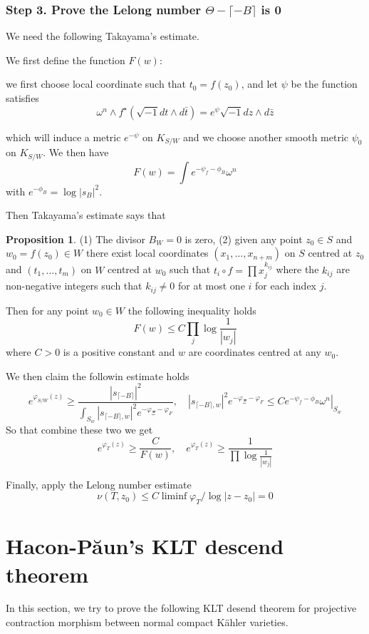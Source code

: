 \documentclass[11pt]{article}
\theoremstyle{definition}
\newtheorem{proposition}[theorem]{Proposition}
\begin{document}
	\subsubsection{Step 3. Prove the Lelong number $\Theta - \lceil -B \rceil $ is 0}
	
	We need the following Takayama's estimate.
	
	
	We first define the function $F(w)$: 
	
	we first choose local coordinate such that $t_0  =f (z_0)$, and let $\psi$ be the function satisfies $$\omega^n \wedge f^{\star}(\sqrt{-1} d t \wedge d \bar{t})=e^\psi \sqrt{-1} d z \wedge d \bar{z}$$
	
	which will induce a metric $e^{-\psi}$ on $K_{S/W}$ and we choose another smooth metric $\psi_0$ on $K_{S/W}$. We then have $$F(w) =  \int e^{-\psi_f - \phi_B} \omega^n$$
	with $e^{-\phi_B} = \log |s_B|^2$.
	
	
	Then Takayama's estimate says that 
	
	\begin{proposition}
		(1) The divisor $B_W=0$ is zero,
		(2) given any point $z_0 \in S$ and $w_0=f\left(z_0\right) \in W$ there exist local coordinates $\left(x_1, \ldots, x_{n+m}\right)$ on $S$ centred at $z_0$ and $\left(t_1, \ldots, t_m\right)$ on $W$ centred at $w_0$ such that $t_i \circ f=\prod x_j^{k_{i j}}$ where the $k_{i j}$ are non-negative integers such that $k_{i j} \neq 0$ for at most one $i$ for each index $j$.
		
		Then for any point $w_0 \in W$ the following inequality holds
		$$
		F(w) \leq C \prod_j \log \frac{1}{\left|w_j\right|}
		$$
		where $C>0$ is a positive constant and $w$ are coordinates centred at any $w_0$.
	\end{proposition}
	
	We then claim the followin estimate holds $$\boxed{e^{\varphi_{S / W}(z)} \geq \frac{\left|s_{\lceil-B\rceil}\right|^2}{\int_{S_w}\left|s_{\lceil-B\rceil, w}\right|^2 e^{-\varphi_{\Xi}-\varphi_F}} ,\quad \left|s_{\lceil-B\rceil, w}\right|^2 e^{-\varphi_{\Xi}-\varphi_F} \leq\left. C e^{-\psi_f-\phi_B} \omega^n\right|_{S_w}}$$
	So that combine these two we get $$\boxed{e^{\varphi_T(z)} \geq \frac{C}{F(w)},\quad e^{\varphi_T (z)} \ge \frac{1}{\prod \log \frac{1}{|w_j|}}}$$
	
	Finally, apply the Lelong number estimate $$\nu(T,z_0) \le C\liminf \varphi_T /\log |z-z_0| =0$$
	
	\section{Hacon-P\u{a}un's KLT descend theorem}
	In this section, we try to prove the following KLT desend theorem for projective contraction morphism between normal compact K\"ahler varieties.
	
\end{document}
